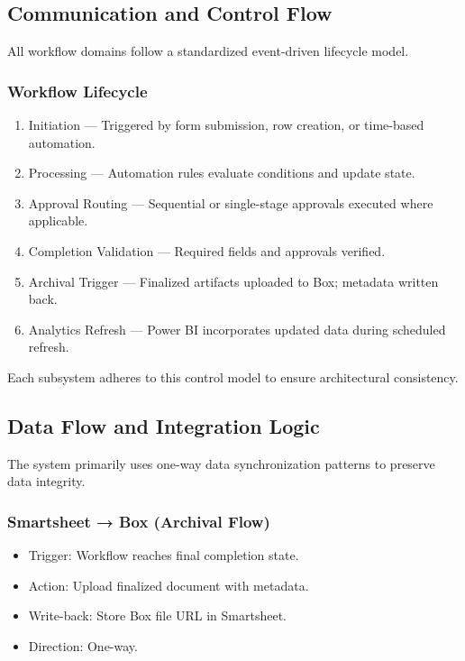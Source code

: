 \documentclass[12pt]{article}
\def\textbf#1{#1}%
\begin{document}
\subsection{Communication and Control Flow}

All workflow domains follow a standardized event-driven lifecycle model.

\subsubsection{Workflow Lifecycle}

\begin{enumerate}
    \item \textbf{Initiation} — Triggered by form submission, row creation, or time-based automation.
    \item \textbf{Processing} — Automation rules evaluate conditions and update state.
    \item \textbf{Approval Routing} — Sequential or single-stage approvals executed where applicable.
    \item \textbf{Completion Validation} — Required fields and approvals verified.
    \item \textbf{Archival Trigger} — Finalized artifacts uploaded to Box; metadata written back.
    \item \textbf{Analytics Refresh} — Power BI incorporates updated data during scheduled refresh.
\end{enumerate}

Each subsystem adheres to this control model to ensure architectural consistency.

\subsection{Data Flow and Integration Logic}

The system primarily uses one-way data synchronization patterns to preserve data integrity.

\subsubsection{Smartsheet → Box (Archival Flow)}

\begin{itemize}
    \item Trigger: Workflow reaches final completion state.
    \item Action: Upload finalized document with metadata.
    \item Write-back: Store Box file URL in Smartsheet.
    \item Direction: One-way.
\end{itemize}
\end{document}
